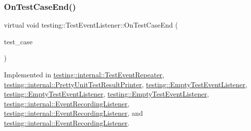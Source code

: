 \mbox{\label{classtesting_1_1_test_event_listener_ae61985e2ef76ac78379b077be57a9c36}} 
\subsubsection{\texorpdfstring{OnTestCaseEnd()}{OnTestCaseEnd()}\hspace{0.1cm}{\footnotesize\ttfamily [1/3]}}
{\footnotesize\ttfamily virtual void testing\+::\+Test\+Event\+Listener\+::\+On\+Test\+Case\+End (\begin{DoxyParamCaption}\item[{const \mbox{\hyperlink{classtesting_1_1_test_case}{Test\+Case}} \&}]{test\+\_\+case }\end{DoxyParamCaption})\hspace{0.3cm}{\ttfamily [pure virtual]}}



Implemented in \mbox{\hyperlink{classtesting_1_1internal_1_1_test_event_repeater_a0a335e1c3957a8c699ed56e37ea7b978}{testing\+::internal\+::\+Test\+Event\+Repeater}}, \mbox{\hyperlink{classtesting_1_1internal_1_1_pretty_unit_test_result_printer_a7a62fe58fa6f6aace813eb62b31e5a51}{testing\+::internal\+::\+Pretty\+Unit\+Test\+Result\+Printer}}, \mbox{\hyperlink{classtesting_1_1_empty_test_event_listener_abe05cc74c1081ed51e2c84b73013299e}{testing\+::\+Empty\+Test\+Event\+Listener}}, \mbox{\hyperlink{classtesting_1_1_empty_test_event_listener_abe05cc74c1081ed51e2c84b73013299e}{testing\+::\+Empty\+Test\+Event\+Listener}}, \mbox{\hyperlink{classtesting_1_1_empty_test_event_listener_a6bec703158283104c4298f7d8a528515}{testing\+::\+Empty\+Test\+Event\+Listener}}, \mbox{\hyperlink{classtesting_1_1internal_1_1_event_recording_listener_a52788314427f5c7a4585ea0bf5f3c251}{testing\+::internal\+::\+Event\+Recording\+Listener}}, \mbox{\hyperlink{classtesting_1_1internal_1_1_event_recording_listener_a52788314427f5c7a4585ea0bf5f3c251}{testing\+::internal\+::\+Event\+Recording\+Listener}}, and \mbox{\hyperlink{classtesting_1_1internal_1_1_event_recording_listener_a4d0cb8a389c7339bce0aa6128291529f}{testing\+::internal\+::\+Event\+Recording\+Listener}}.

\mbox{\label{classtesting_1_1_test_event_listener_a6cada1572dde8010b94f6dd237ce52f4}} 
